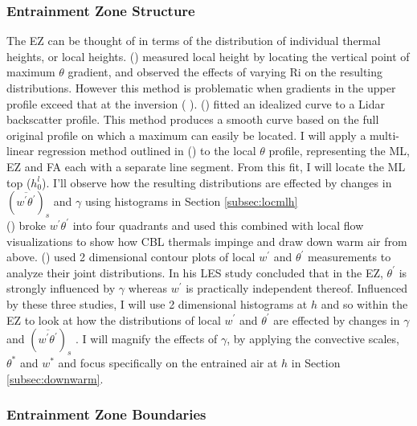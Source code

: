 \subsubsection{Entrainment Zone Structure}     
The \acs{EZ} can be thought of in terms of the distribution of individual thermal heights, or local heights. \citeauthor{SullMoengStev} (\citeyear{SullMoengStev}) measured local height by locating the vertical point of maximum $\theta$ gradient, and observed the effects of varying \acs{Ri} on the resulting distributions. However this method is problematic when gradients in the upper profile exceed that at the inversion (\citeauthor{BrooksFowler2} \citeyear{BrooksFowler2}).  \citeauthor{SteynBaldHoff} (\citeyear{SteynBaldHoff}) fitted an idealized curve to a Lidar backscatter profile.  This method produces a smooth curve based on the full original profile on which a maximum can easily be located.  I will apply a multi-linear regression method outlined in \citeauthor{Vieth} (\citeyear{Vieth}) to the local $\theta$ profile, representing the \acs{ML}, \acs{EZ} and \acs{FA} each with a separate line segment. From this fit, I will locate the \acs{ML} top ($h^{l}_{0}$).  I'll observe how the resulting distributions are effected by changes in $(\overline{w^{'}\theta^{'}})_{s}$ and $\gamma$ using histograms in Section \ref{subsec:locmlh}\\

\citeauthor{SullMoengStev} (\citeyear{SullMoengStev}) broke $w^{'}\theta^{'}$ into four quadrants and used this combined with local flow visualizations to show how \acs{CBL} thermals impinge and draw down warm air from above. \citeauthor{MahrtPaum} (\citeyear{MahrtPaum}) used 2 dimensional contour plots of local $w^{'}$ and $\theta^{'}$ measurements to analyze their joint distributions.  In his \citeyear{Sorbjan1} \acs{LES} study \citeauthor{Sorbjan1} concluded that in the \acs{EZ}, $\theta^{'}$ is strongly influenced by $\gamma$  whereas $w^{'}$ is practically independent thereof.  Influenced by these three studies, I will use 2 dimensional histograms at $h$ and so within the \acs{EZ} to look at how the distributions of local $w^{'}$ and $\theta^{'}$ are effected by changes in $\gamma$ and $(\overline{w^{'}\theta^{'}})_{s}$ .  I will magnify the effects of $\gamma$, by applying the convective scales, $\theta^{*}$ and $w^{*}$ and focus specifically on the entrained air at $h$ in Section \ref{subsec:downwarm}.\\    

\subsubsection{Entrainment Zone Boundaries}
       
